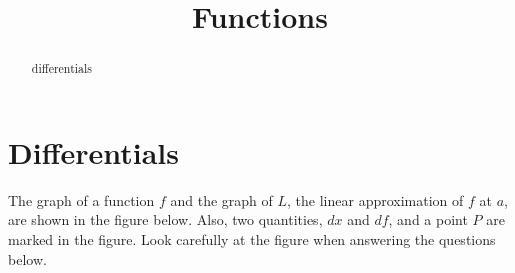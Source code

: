 \documentclass{ximera}
\title{Functions}
\begin{document}
\begin{abstract}
differentials
\end{abstract}
\maketitle







\section{Differentials}

The  graph of a function $f$ and the graph of $L$, the linear approximation of $f$ at $a$, are shown in the figure below.
Also, two quantities, $dx$ and $df$, and a point $P$ are marked in the figure. Look carefully at the figure when answering the questions below.
\end{document}

